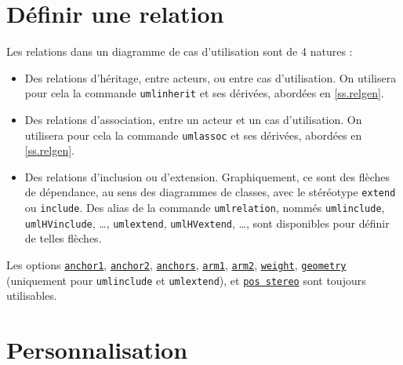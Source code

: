 \documentclass[a4paper,11pt]{report}
\newcommand{\inputTikZ}[1]{%
  }%
\newcommand{\inputTikZ}[1]{%
    \texttt{[image: fig/\#1.pdf]}%
  }%
\begin{document}
\section{Définir une relation}\label{s.userel}

Les relations dans un diagramme de cas d'utilisation sont de 4 natures :

\begin{itemize}
\item Des relations d'héritage, entre acteurs, ou entre cas d'utilisation. On utilisera pour cela la commande {\tt umlinherit} et ses dérivées, abordées en \autoref{ss.relgen}.
\item Des relations d'association, entre un acteur et un cas d'utilisation. On utilisera pour cela la commande {\tt umlassoc} et ses dérivées, abordées en \autoref{ss.relgen}.
\item Des relations d'inclusion ou d'extension. Graphiquement, ce sont des flèches de dépendance, au sens des diagrammes de classes, avec le stéréotype {\tt extend} ou {\tt include}. Des alias de la commande {\tt umlrelation}, nommés {\tt umlinclude}, {\tt umlHVinclude}, \ldots, {\tt umlextend}, {\tt umlHVextend}, \ldots, sont disponibles pour définir de telles flèches.
\end{itemize}

Les options \hyperlink{anchor1}{{\tt anchor1}}, \hyperlink{anchor2}{{\tt anchor2}}, \hyperlink{anchors}{{\tt anchors}}, \hyperlink{arm1}{{\tt arm1}}, \hyperlink{arm2}{{\tt arm2}}, \hyperlink{weight}{{\tt weight}}, \hyperlink{geometry}{{\tt geometry}} (uniquement pour {\tt umlinclude} et {\tt umlextend}), et \hyperlink{posstereo}{{\tt pos stereo}} sont toujours utilisables.

\medskip

\begin{minipage}{0.51\textwidth}

\end{minipage}
\begin{minipage}{0.49\textwidth}
\begin{center}
\inputTikZ{include-and-extend}
\end{center}
\end{minipage}

\medskip

\section{Personnalisation}\label{s.fitusecase}
\end{document}
